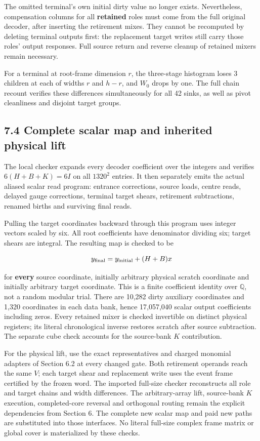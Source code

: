 \documentclass[
  11pt,
]{article}
\begin{document}
The omitted terminal's own initial dirty value no longer exists.
Nevertheless, compensation columns for all \textbf{retained} roles must
come from the full original decoder, after inserting the retirement
mixes. They cannot be recomputed by deleting terminal outputs first: the
replacement target writes still carry those roles' output responses.
Full source return and reverse cleanup of retained mixers remain
necessary.

For a terminal at root-frame dimension \(r\), the three-stage histogram
loses \(3\) children at each of widths \(r\) and \(h-r\), and \(W_0\)
drops by one. The full chain recount verifies these differences
simultaneously for all 42 sinks, as well as pivot cleanliness and
disjoint target groups.

\subsection{7.4 Complete scalar map and inherited physical
lift}\label{complete-scalar-map-and-inherited-physical-lift}

The local checker expands every decoder coefficient over the integers
and verifies \(6(H+B+K)=6I\) on all \(1320^2\) entries. It then
separately emits the actual aliased scalar read program: entrance
corrections, source loads, centre reads, delayed gauge corrections,
terminal target shears, retirement subtractions, renamed births and
surviving final reads.

Pulling the target coordinates backward through this program uses
integer vectors scaled by six. All root coefficients have denominator
dividing six; target shears are integral. The resulting map is checked
to be

\[
y_{\rm final}=y_{\rm initial}+(H+B)x
\]

for \textbf{every} source coordinate, initially arbitrary physical
scratch coordinate and initially arbitrary target coordinate. This is a
finite coefficient identity over \(\mathbb Q\), not a random modular
trial. There are 10,282 dirty auxiliary coordinates and 1,320
coordinates in each data bank, hence 17,057,040 scalar output
coefficients including zeros. Every retained mixer is checked invertible
on distinct physical registers; its literal chronological inverse
restores scratch after source subtraction. The separate cube check
accounts for the source-bank \(K\) contribution.

For the physical lift, use the exact representatives and charged
monomial adapters of Section 6.2 at every changed gate. Both retirement
operands reach the same \(V\); each target shear and replacement write
uses the event frame certified by the frozen word. The imported
full-size checker reconstructs all role and target chains and width
differences. The arbitrary-array lift, source-bank \(K\) execution,
completed-core reversal and orthogonal routing remain the explicit
dependencies from Section 6. The complete new scalar map and paid new
paths are substituted into those interfaces. No literal full-size
complex frame matrix or global cover is materialized by these checks.
\end{document}
